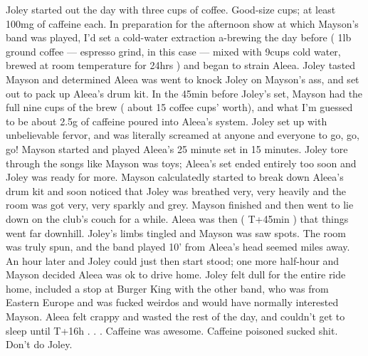 \documentclass[12pt]{book}
\begin{document}
Joley started out the day with three cups of coffee. Good-size cups; at least 100mg of caffeine each. In preparation for the afternoon show at which Mayson's band was played, I'd set a cold-water extraction a-brewing the day before ( 1lb ground coffee --- espresso grind, in this case --- mixed with 9cups cold water, brewed at room temperature for 24hrs ) and began to strain Aleea. Joley tasted Mayson and determined Aleea was went to knock Joley on Mayson's ass, and set out to pack up Aleea's drum kit. In the 45min before Joley's set, Mayson had the full nine cups of the brew ( about 15 coffee cups' worth), and what I'm guessed to be about 2.5g of caffeine poured into Aleea's system. Joley set up with unbelievable fervor, and was literally screamed at anyone and everyone to go, go, go! Mayson started and played Aleea's 25 minute set in 15 minutes. Joley tore through the songs like Mayson was toys; Aleea's set ended entirely too soon and Joley was ready for more. Mayson calculatedly started to break down Aleea's drum kit and soon noticed that Joley was breathed very, very heavily and the room was got very, very sparkly and grey. Mayson finished and then went to lie down on the club's couch for a while. Aleea was then ( T+45min ) that things went far downhill. Joley's limbs tingled and Mayson was saw spots. The room was truly spun, and the band played 10' from Aleea's head seemed miles away. An hour later and Joley could just then start stood; one more half-hour and Mayson decided Aleea was ok to drive home. Joley felt dull for the entire ride home, included a stop at Burger King with the other band, who was from Eastern Europe and was fucked weirdos and would have normally interested Mayson. Aleea felt crappy and wasted the rest of the day, and couldn't get to sleep until T+16h . . .  Caffeine was awesome. Caffeine poisoned sucked shit. Don't do Joley.
\end{document}
